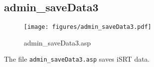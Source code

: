 \subsection{admin\_saveData3}
\begin{figure}[htb]
    \begin{center}
        \texttt{[image: figures/admin\_saveData3.pdf]}
    \end{center}
    \caption{admin\_saveData3.asp}
    \label{fig:admin_saveData3}
\end{figure}

The file \verb|admin_saveData3.asp| saves iSRT data.
